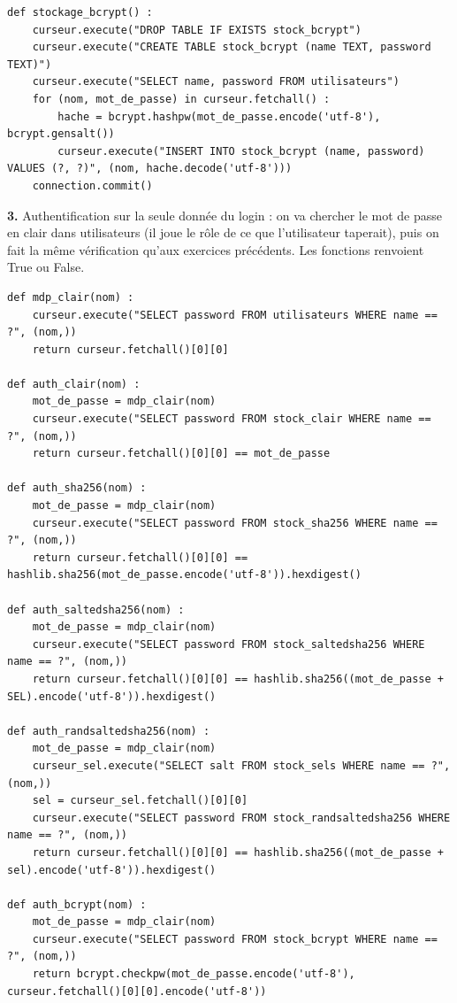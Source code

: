 \documentclass[11pt,a4paper]{article}
\newcommand{\code}[1]{\colorbox{fondcode}{\ttfamily\small #1}}
\begin{document}
\begin{lstlisting}
def stockage_bcrypt() :
    curseur.execute("DROP TABLE IF EXISTS stock_bcrypt")
    curseur.execute("CREATE TABLE stock_bcrypt (name TEXT, password TEXT)")
    curseur.execute("SELECT name, password FROM utilisateurs")
    for (nom, mot_de_passe) in curseur.fetchall() :
        hache = bcrypt.hashpw(mot_de_passe.encode('utf-8'), bcrypt.gensalt())
        curseur.execute("INSERT INTO stock_bcrypt (name, password) VALUES (?, ?)", (nom, hache.decode('utf-8')))
    connection.commit()
\end{lstlisting}

\textbf{3.} Authentification \og sur la seule donnée du login \fg{} : on va chercher le mot de passe en clair dans \code{utilisateurs} (il joue le rôle de ce que l'utilisateur taperait), puis on fait la même vérification qu'aux exercices précédents. Les fonctions renvoient \code{True} ou \code{False}.

\begin{lstlisting}
def mdp_clair(nom) :
    curseur.execute("SELECT password FROM utilisateurs WHERE name == ?", (nom,))
    return curseur.fetchall()[0][0]

def auth_clair(nom) :
    mot_de_passe = mdp_clair(nom)
    curseur.execute("SELECT password FROM stock_clair WHERE name == ?", (nom,))
    return curseur.fetchall()[0][0] == mot_de_passe

def auth_sha256(nom) :
    mot_de_passe = mdp_clair(nom)
    curseur.execute("SELECT password FROM stock_sha256 WHERE name == ?", (nom,))
    return curseur.fetchall()[0][0] == hashlib.sha256(mot_de_passe.encode('utf-8')).hexdigest()

def auth_saltedsha256(nom) :
    mot_de_passe = mdp_clair(nom)
    curseur.execute("SELECT password FROM stock_saltedsha256 WHERE name == ?", (nom,))
    return curseur.fetchall()[0][0] == hashlib.sha256((mot_de_passe + SEL).encode('utf-8')).hexdigest()

def auth_randsaltedsha256(nom) :
    mot_de_passe = mdp_clair(nom)
    curseur_sel.execute("SELECT salt FROM stock_sels WHERE name == ?", (nom,))
    sel = curseur_sel.fetchall()[0][0]
    curseur.execute("SELECT password FROM stock_randsaltedsha256 WHERE name == ?", (nom,))
    return curseur.fetchall()[0][0] == hashlib.sha256((mot_de_passe + sel).encode('utf-8')).hexdigest()

def auth_bcrypt(nom) :
    mot_de_passe = mdp_clair(nom)
    curseur.execute("SELECT password FROM stock_bcrypt WHERE name == ?", (nom,))
    return bcrypt.checkpw(mot_de_passe.encode('utf-8'), curseur.fetchall()[0][0].encode('utf-8'))
\end{lstlisting}
\end{document}
